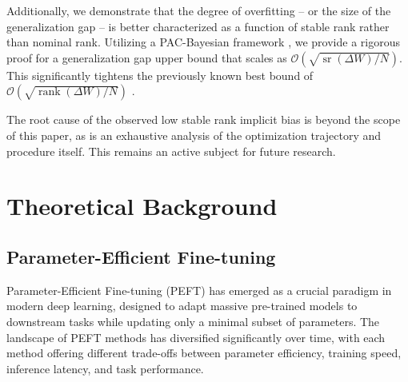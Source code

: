 \documentclass[a4paper,14pt]{extarticle}
\DeclareMathOperator{\rank}{rank}
\DeclareMathOperator{\sr}{sr}
\begin{document}
    Additionally, we demonstrate that the degree of overfitting -- or the size of the generalization gap -- is better characterized as a function of stable rank rather than nominal rank.
    Utilizing a PAC-Bayesian framework \cite{mcallester1999pac, mcallester2003simplified}, we provide a rigorous proof for a generalization gap upper bound that scales as $\mathcal{O}(\sqrt{\sr(\Delta W)/N})$. 
    This significantly tightens the previously known best bound of $\mathcal{O}(\sqrt{\rank(\Delta W)/N})$ \cite{kratsios2025sharpgeneralizationboundsfoundation}.
    
    The root cause of the observed low stable rank implicit bias is beyond the scope of this paper, as is an exhaustive analysis of the optimization trajectory and procedure itself. 
    This remains an active subject for future research.


    \section{Theoretical Background}


    \subsection{Parameter-Efficient Fine-tuning}

    Parameter-Efficient Fine-tuning (PEFT) has emerged as a crucial paradigm in modern deep learning, designed to adapt massive pre-trained models to downstream tasks while updating only a minimal subset of parameters. 
    The landscape of PEFT methods has diversified significantly over time, with each method offering different trade-offs between parameter efficiency, training speed, inference latency, and task performance.
\end{document}
